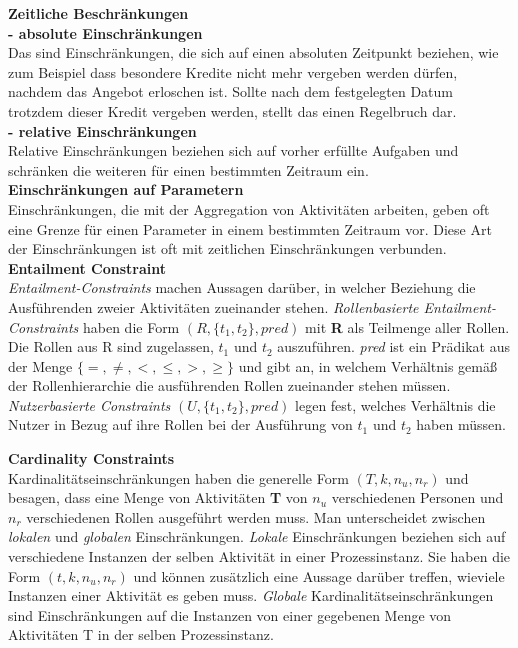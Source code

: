 \textbf{Zeitliche Beschränkungen}\\
\textbf{- absolute Einschränkungen}\\
Das sind Einschränkungen, die sich auf einen absoluten Zeitpunkt beziehen, wie zum Beispiel dass besondere Kredite nicht mehr vergeben werden dürfen, nachdem das Angebot erloschen ist. Sollte nach dem festgelegten Datum trotzdem dieser Kredit vergeben werden, stellt das einen Regelbruch dar.\\
\textbf{- relative Einschränkungen}\\
Relative Einschränkungen beziehen sich auf vorher erfüllte Aufgaben und schränken die weiteren für einen bestimmten Zeitraum ein.\\

\textbf{Einschränkungen auf Parametern}\\
Einschränkungen, die mit der Aggregation von Aktivitäten arbeiten, geben oft eine Grenze für einen Parameter in einem bestimmten Zeitraum vor. Diese Art der Einschränkungen ist oft mit zeitlichen Einschränkungen verbunden.\\

\textbf{Entailment Constraint}\\
\textit{Entailment-Constraints} machen Aussagen darüber, in welcher Beziehung die Ausführenden zweier Aktivitäten zueinander stehen.
\textit{Rollenbasierte Entailment-Constraints} haben die Form $(R, \{t_1,t_2\}, pred)$ mit \textbf{R} als Teilmenge aller Rollen. Die Rollen aus R sind zugelassen, $t_1$ und $t_2$ auszuführen. \textit{pred} ist ein Prädikat aus der Menge $\{=, \neq,<, \leq,>, \geq \}$ und gibt an, in welchem Verhältnis gemäß der Rollenhierarchie die ausführenden Rollen zueinander stehen müssen.\\
\textit{Nutzerbasierte Constraints} $(U, \{t_1,t_2\}, pred)$ legen fest, welches Verhältnis die Nutzer in Bezug auf ihre Rollen bei der Ausführung von $t_1$ und $t_2$ haben müssen.
\cite{wolter_modeling_of_TBAC_in_BPMN} \cite{Entailment1} \cite{tan_consistency}

\textbf{Cardinality Constraints}\\
Kardinalitätseinschränkungen haben die generelle Form $(T, k, n_u, n_r)$ und besagen, dass eine Menge von Aktivitäten \textbf{T} von $n_u$ verschiedenen Personen und $n_r$ verschiedenen Rollen ausgeführt werden muss. Man unterscheidet zwischen \textit{lokalen} und \textit{globalen} Einschränkungen. \textit{Lokale} Einschränkungen beziehen sich auf verschiedene Instanzen der selben Aktivität in einer Prozessinstanz. Sie haben die Form $(t, k, n_u, n_r)$ und können zusätzlich eine Aussage darüber treffen, wieviele Instanzen einer Aktivität es geben muss. \textit{Globale} Kardinalitätseinschränkungen sind Einschränkungen auf die Instanzen von einer gegebenen Menge von Aktivitäten T in der selben Prozessinstanz.
\cite{wolter_modeling_of_TBAC_in_BPMN} \cite{Entailment1} \cite{tan_consistency}


